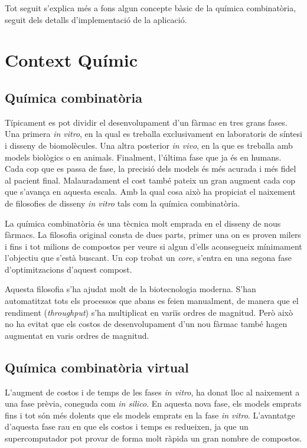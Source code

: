\documentclass[titlepage,a4paper,12pt]{book}
\begin{document}
	Tot seguit s'explica més a fons algun concepte bàsic de la química
	combinatòria, seguit dels detalls d'implementació de la aplicació.


\section{Context Químic} %
	\label{sec:Context Quimic}

	\subsection{Química combinatòria}
	Típicament es pot dividir el desenvolupament d'un fàrmac en tres grans
	fases. Una primera \emph{in vitro}, en la qual es treballa exclusivament en
	laboratoris de síntesi i disseny de biomolècules. Una altra posterior
	\emph{in vivo}, en la que es treballa amb models biològics o en animals.
	Finalment, l'última fase que ja és en humans. Cada cop que es passa de fase,
	la precisió dels models és més acurada i més fidel al pacient final.
	Malauradament el cost també pateix un gran augment cada cop que s'avança en
	aquesta escala. Amb la qual cosa això ha propiciat el naixement de
	filosofies de disseny \emph{in vitro} tals com la química combinatòria.

	La química combinatòria és una tècnica molt emprada en el disseny de nous
	fàrmacs. La filosofia original consta de dues parts, primer una on es proven
	milers i fins i tot milions de compostos per veure si algun d'ells
	aconsegueix mínimament l'objectiu que s'està buscant. Un cop trobat un
	\emph{core}, s'entra en una segona fase d'optimitzacions d'aquest compost.

	Aquesta filosofia s'ha ajudat molt de la biotecnologia moderna. S'han
	automatitzat tots els processos que abans es feien manualment, de manera que
	el rendiment (\emph{throughput}) s'ha multiplicat en variïs ordres de
	magnitud. Però això no ha evitat que els costos de desenvolupament d'un nou
	fàrmac també hagen augmentat en varis ordres de magnitud.

	\subsection{Química combinatòria virtual}

	L'augment de costos i de temps de les fases \emph{in vitro}, ha donat lloc
	al naixement a una fase prèvia, coneguda com \emph{in silico}. En aquesta
	nova fase, els models emprats fins i tot són més dolents que els models
	emprats en la fase \emph{in vitro}.  L'avantatge d'aquesta fase rau en que
	els costos i temps es redueixen, ja que un supercomputador pot provar de
	forma molt ràpida un gran nombre de compostos.
\end{document}
